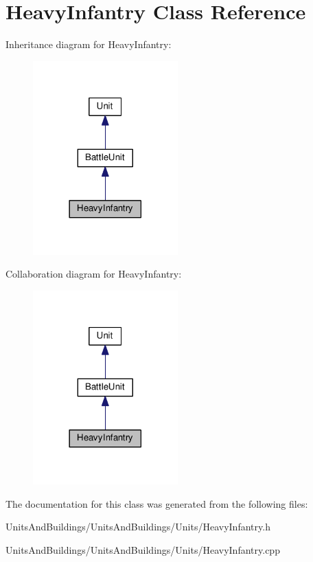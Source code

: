 \hypertarget{class_heavy_infantry}{}\section{Heavy\+Infantry Class Reference}
\label{class_heavy_infantry}


Inheritance diagram for Heavy\+Infantry\+:
\nopagebreak
\begin{figure}[H]
\begin{center}
\leavevmode
\includegraphics[width=158pt]{class_heavy_infantry__inherit__graph}
\end{center}
\end{figure}


Collaboration diagram for Heavy\+Infantry\+:
\nopagebreak
\begin{figure}[H]
\begin{center}
\leavevmode
\includegraphics[width=158pt]{class_heavy_infantry__coll__graph}
\end{center}
\end{figure}


The documentation for this class was generated from the following files\+:\begin{DoxyCompactItemize}
\item 
Units\+And\+Buildings/\+Units\+And\+Buildings/\+Units/Heavy\+Infantry.\+h\item 
Units\+And\+Buildings/\+Units\+And\+Buildings/\+Units/Heavy\+Infantry.\+cpp\end{DoxyCompactItemize}
